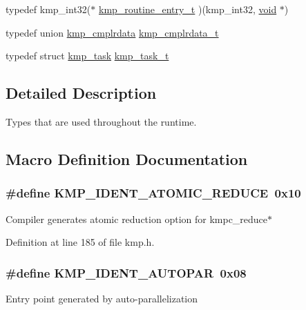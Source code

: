 \begin{DoxyCompactItemize}
\item 
typedef kmp\-\_\-int32($\ast$ \hyperlink{group__BASIC__TYPES_ga76e21422ff9984d9bafd0b36277ae115}{kmp\-\_\-routine\-\_\-entry\-\_\-t} )(kmp\-\_\-int32, \hyperlink{ittnotify__static_8h_af941d56e55e3c5465135b60c4d6343ed}{void} $\ast$)
\item 
typedef union \hyperlink{unionkmp__cmplrdata}{kmp\-\_\-cmplrdata} \hyperlink{group__BASIC__TYPES_gad4583610db83a88008a785b332fdfd39}{kmp\-\_\-cmplrdata\-\_\-t}
\item 
typedef struct \hyperlink{structkmp__task}{kmp\-\_\-task} \hyperlink{group__BASIC__TYPES_ga2783514e154e897944132a3ba6ed8789}{kmp\-\_\-task\-\_\-t}
\end{DoxyCompactItemize}


\subsection{Detailed Description}
Types that are used throughout the runtime. 

\subsection{Macro Definition Documentation}
\hypertarget{group__BASIC__TYPES_gaf2f9e5d03f9f38651a3b8d5ef8635d44}{
\subsubsection[{K\-M\-P\-\_\-\-I\-D\-E\-N\-T\-\_\-\-A\-T\-O\-M\-I\-C\-\_\-\-R\-E\-D\-U\-C\-E}]{\setlength{\rightskip}{0pt plus 5cm}\#define K\-M\-P\-\_\-\-I\-D\-E\-N\-T\-\_\-\-A\-T\-O\-M\-I\-C\-\_\-\-R\-E\-D\-U\-C\-E~0x10}}\label{group__BASIC__TYPES_gaf2f9e5d03f9f38651a3b8d5ef8635d44}
Compiler generates atomic reduction option for kmpc\-\_\-reduce$\ast$ 

Definition at line 185 of file kmp.\-h.

\hypertarget{group__BASIC__TYPES_ga744ef043bd848d5e338b4c72ef247adc}{
\subsubsection[{K\-M\-P\-\_\-\-I\-D\-E\-N\-T\-\_\-\-A\-U\-T\-O\-P\-A\-R}]{\setlength{\rightskip}{0pt plus 5cm}\#define K\-M\-P\-\_\-\-I\-D\-E\-N\-T\-\_\-\-A\-U\-T\-O\-P\-A\-R~0x08}}\label{group__BASIC__TYPES_ga744ef043bd848d5e338b4c72ef247adc}
Entry point generated by auto-\/parallelization 

